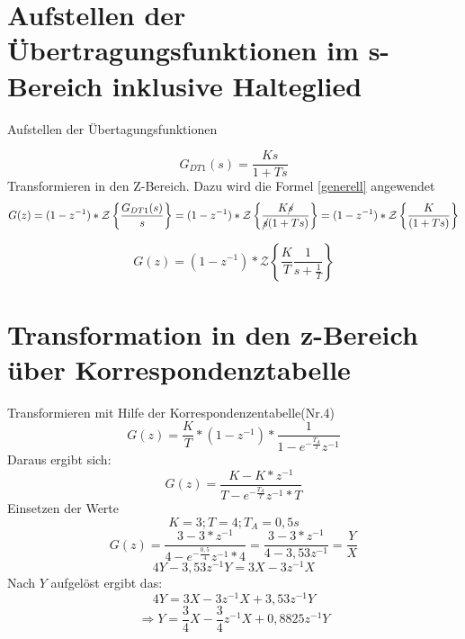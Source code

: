 \documentclass[12pt,a4paper]{report}
\begin{document}
\section{Aufstellen der Übertragungsfunktionen im s-Bereich inklusive Halteglied}
Aufstellen der Übertagungsfunktionen

\begin{equation}
G_{DT1}(s) = \frac{Ks}{1+Ts} 
\end{equation}
Transformieren in den Z-Bereich. Dazu wird die Formel \ref{generell} angewendet
\begin{equation}
G(z) = (1-z^{-1})*\mathcal{Z}\left\{\frac{G_{DT1}(s)}{s}\right\} = (1-z^{-1})*\mathcal{Z}\left\{\frac{K\cancel{s}}{\cancel{s}(1+Ts)}\right\} = (1-z^{-1})*\mathcal{Z}\left\{\frac{K}{(1+Ts)}\right\}
\end{equation}

\begin{equation}
G(z) = (1-z^{-1})*\mathcal{Z}\left\{\frac{K}{T}\frac{1}{s+\frac{1}{T}}\right\}
\end{equation}
\section{Transformation in den z-Bereich über Korrespondenztabelle}
Transformieren mit Hilfe der Korrespondenzentabelle(Nr.4)
\begin{equation}
G(z) = \frac{K}{T}*(1-z^{-1})*
\frac{1}
{1-e^{-\frac{T_A}{T}}z^{-1}}
\end{equation}
Daraus ergibt sich: 
\begin{equation}
G(z) = \frac{K-K*z^{-1}}
{T-e^{-\frac{T_A}{T}}z^{-1}*T} 
\end{equation}
Einsetzen der Werte
\begin{equation}
K = 3; T = 4; T_A = 0,5s
\end{equation}
\begin{equation}
G(z) = \frac{3-3*z^{-1}}
{4-e^{-\frac{0,5}{4}}z^{-1}*4} = \frac{3-3*z^{-1}}
{4-3,53z^{-1}} = \frac{Y}{X}
\end{equation}
\begin{equation}
4Y- 3,53z^{-1}Y = 3X -3z^{-1}X
\end{equation}
Nach $ Y $ aufgelöst ergibt das:
\begin{equation}
4Y = 3X- 3z^{-1}X + 3,53z^{-1}Y
\end{equation}
\begin{equation}
\Rightarrow Y = \frac{3}{4}X- \frac{3}{4}z^{-1}X + 0,8825z^{-1}Y
\end{equation}
\end{document}
